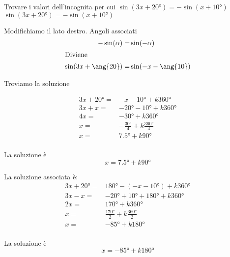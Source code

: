 \begin{exercise}
	Trovare i valori dell'incognita per cui $\sin(3x+\ang{20})=-\sin(x+\ang{10;;})$
	\tcblower
	$\sin(3x+\ang{20})=-\sin(x+\ang{10;;})$
	
Modifichiamo il lato destro. Angoli associati
\begin{align*}
-\sin(\alpha)=&\sin(-\alpha)\\
\intertext{Diviene}
\sin(3x+\ang{20})=&\sin(-x-\ang{10})
\end{align*}	

	Troviamo la soluzione
	
	\begin{align*}
3x+\ang{20}=&-x-\ang{10}+k\ang{360}\\
3x+x=&-\ang{20}-\ang{10}+k\ang{360}\\
4x=&-\ang{30}+k\ang{360}\\
x=&-\frac{\ang{30}}{4}+k\frac{\ang{360}}{4}\\
x=&\ang{7.5}+k\ang{90}\\
	\end{align*}
	
	La soluzione è
	\[x=\ang{7.5}+k\ang{90}\]
	
La soluzione associata è:
\begin{align*}
3x+\ang{20}=&\ang{180}-(-x-\ang{10})+k\ang{360}\\
3x-x=&- \ang{20}+\ang{10}+\ang{180}+k\ang{360}\\
2x=&\ang{170}+k\ang{360}\\
x=&\frac{\ang{170}}{2}+k\frac{\ang{360}}{2}\\
x=&-\ang{85}+k\ang{180}\\
\end{align*}

La soluzione è
\[x=-\ang{85}+k\ang{180}\]
\end{exercise}
